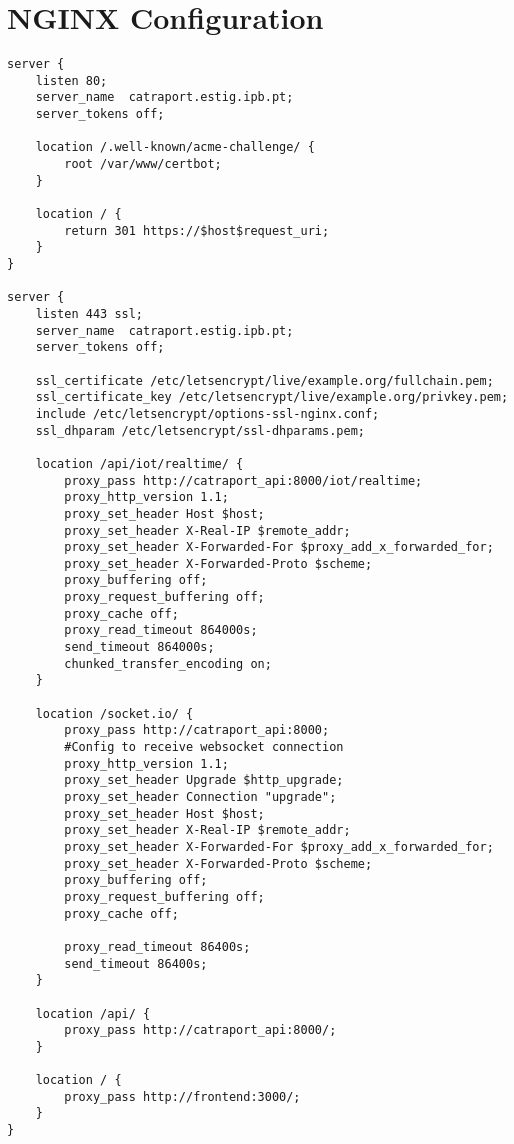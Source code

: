 \section{NGINX Configuration}\label{apendice1nginx}
\begin{Verbatim}[fontsize=\small, baselinestretch=0.8]
    server {
    listen 80;
    server_name  catraport.estig.ipb.pt;
    server_tokens off;

    location /.well-known/acme-challenge/ {
        root /var/www/certbot;
    }

    location / {
        return 301 https://$host$request_uri;
    }
}

server {
    listen 443 ssl;
    server_name  catraport.estig.ipb.pt;
    server_tokens off;

    ssl_certificate /etc/letsencrypt/live/example.org/fullchain.pem;
    ssl_certificate_key /etc/letsencrypt/live/example.org/privkey.pem;
    include /etc/letsencrypt/options-ssl-nginx.conf;
    ssl_dhparam /etc/letsencrypt/ssl-dhparams.pem;

    location /api/iot/realtime/ {
        proxy_pass http://catraport_api:8000/iot/realtime;
        proxy_http_version 1.1;
        proxy_set_header Host $host;
        proxy_set_header X-Real-IP $remote_addr;
        proxy_set_header X-Forwarded-For $proxy_add_x_forwarded_for;
        proxy_set_header X-Forwarded-Proto $scheme;
        proxy_buffering off;
        proxy_request_buffering off;
        proxy_cache off;
        proxy_read_timeout 864000s;
        send_timeout 864000s;
        chunked_transfer_encoding on;
    }

    location /socket.io/ {
        proxy_pass http://catraport_api:8000;
        #Config to receive websocket connection
        proxy_http_version 1.1;
        proxy_set_header Upgrade $http_upgrade;
        proxy_set_header Connection "upgrade";
        proxy_set_header Host $host;
        proxy_set_header X-Real-IP $remote_addr;
        proxy_set_header X-Forwarded-For $proxy_add_x_forwarded_for;
        proxy_set_header X-Forwarded-Proto $scheme;
        proxy_buffering off;
        proxy_request_buffering off;
        proxy_cache off;

        proxy_read_timeout 86400s;
        send_timeout 86400s;
    }

    location /api/ {
        proxy_pass http://catraport_api:8000/;
    }

    location / {
        proxy_pass http://frontend:3000/;
    }
}
\end{Verbatim}


